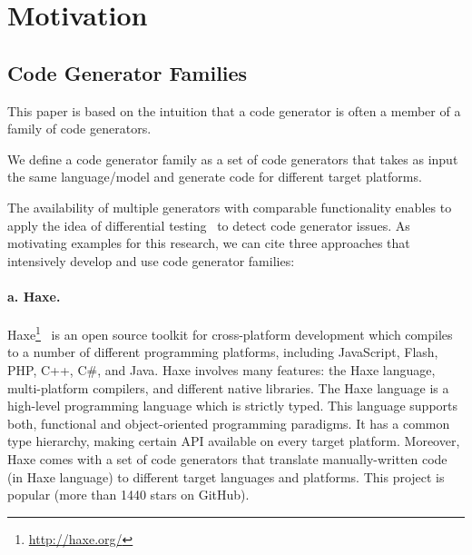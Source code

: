 


\section{Motivation}

\subsection{Code Generator Families}
This paper is based on the intuition that a code generator is often a member of a family of code generators.
\begin{mydef}
We define a code generator family as a set of code generators that takes as input the same language/model and generate code for different target platforms.
\end{mydef}
The availability of multiple generators with comparable functionality enables to apply the idea of differential testing~\cite{mckeeman1998differential} to detect code generator issues.
As motivating examples for this research, we can cite three approaches that intensively develop and use code generator families: 
\paragraph{a. Haxe.} 	Haxe\footnote{\url{http://haxe.org/}}~\cite{dasnois2011haxe} is an open source toolkit for cross-platform development which compiles to a number of different programming platforms, including JavaScript, Flash, PHP, C++, C\#, and Java. Haxe involves many features: the Haxe language, multi-platform compilers, and different native libraries. The Haxe language is a high-level programming language which is strictly typed. This language supports both, functional and object-oriented programming paradigms. It has a common type hierarchy, making certain API available on every target platform. Moreover, Haxe comes with a set of code generators that translate manually-written code (in Haxe language) to different target languages and platforms.  
This project is popular (more than \num{1440} stars on GitHub).

